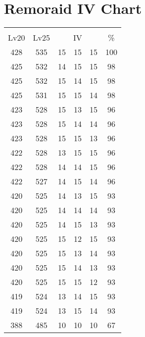 \documentclass{article}%
\begin{document}
%
\normalsize%
\section{Remoraid IV Chart}%
\label{sec:Remoraid IV Chart}%
\renewcommand{\arraystretch}{1.5}%
\begin{tabular}{|c|c|c|c|c|c|}%
\hline%
\multicolumn{6}{|c|}{\textcolor{white}{ 
\linebreak{Remoraid}
}%
\cellcolor{black}}\\%
\multicolumn{1}{|c}{Lv20}&\multicolumn{1}{c|}{Lv25}&\multicolumn{3}{c|}{IV}&\multicolumn{1}{|c|}{\%}\\%
\hline%
\rowcolor{color100}%
428&535&15&15&15&100\\%
\hline%
\rowcolor{color98}%
425&532&14&15&15&98\\%
\hline%
\rowcolor{color98}%
425&532&15&14&15&98\\%
\hline%
\rowcolor{color98}%
425&531&15&15&14&98\\%
\hline%
\rowcolor{color96}%
423&528&15&13&15&96\\%
\hline%
\rowcolor{color96}%
423&528&15&14&14&96\\%
\hline%
\rowcolor{color96}%
423&528&15&15&13&96\\%
\hline%
\rowcolor{color96}%
422&528&13&15&15&96\\%
\hline%
\rowcolor{color96}%
422&528&14&14&15&96\\%
\hline%
\rowcolor{color96}%
422&527&14&15&14&96\\%
\hline%
\rowcolor{color93}%
420&525&14&13&15&93\\%
\hline%
\rowcolor{color93}%
420&525&14&14&14&93\\%
\hline%
\rowcolor{color93}%
420&525&14&15&13&93\\%
\hline%
\rowcolor{color93}%
420&525&15&12&15&93\\%
\hline%
\rowcolor{color93}%
420&525&15&13&14&93\\%
\hline%
\rowcolor{color93}%
420&525&15&14&13&93\\%
\hline%
\rowcolor{color93}%
420&525&15&15&12&93\\%
\hline%
\rowcolor{color93}%
419&524&13&14&15&93\\%
\hline%
\rowcolor{color93}%
419&524&13&15&14&93\\%
\hline%
\rowcolor{color91}%
388&485&10&10&10&67\\%
\end{tabular}

%
\end{document}
